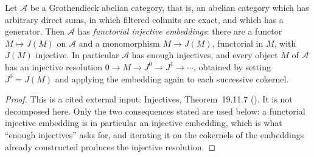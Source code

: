 \begin{lemma}
\label{lem:pc-grothendieck-enough-injectives}
Let $\mathcal A$ be a Grothendieck abelian category, that is, an abelian category
which has arbitrary direct sums, in which filtered colimits are exact, and which has a
generator.  Then $\mathcal A$ has \emph{functorial injective embeddings}: there are a
functor $M\mapsto J(M)$ on $\mathcal A$ and a monomorphism $M\to J(M)$, functorial in
$M$, with $J(M)$ injective.  In particular $\mathcal A$ has enough injectives, and every
object $M$ of $\mathcal A$ has an injective resolution $0\to M\to J^0\to J^1\to\cdots$,
obtained by setting $J^0=J(M)$ and applying the embedding again to each successive
cokernel.
\end{lemma}
\begin{proof}
This is a cited external input: Injectives, Theorem~19.11.7 ().
It is not decomposed here.  Only the two consequences stated are used below: a
functorial injective embedding is in particular an injective embedding, which is what
``enough injectives'' asks for, and iterating it on the cokernels of the embeddings
already constructed produces the injective resolution.
\end{proof}

